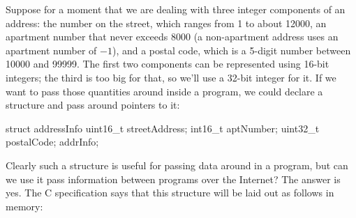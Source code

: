 Suppose for a moment that we are dealing with
three integer components of an address: the number on the street,
which ranges from 1 to about 12000, an apartment number that never exceeds
8000 (a non-apartment address uses an apartment number of $-1$),
and a postal code, which is a 5-digit number between 10000 and
99999.  The first two components can be represented using
16-bit integers; the third is too big for that, so we'll use a 32-bit
integer for it.
%
If we want to pass those quantities around inside a program, we could
declare a structure and pass around pointers to it:
%
\begin{inlinecode}
  struct addressInfo {
     uint16_t  streetAddress;
     int16_t  aptNumber;
     uint32_t   postalCode;
  } addrInfo;
\end{inlinecode}
%
Clearly such a structure is useful for passing data around in a
program, but can we use it pass information between programs over the
Internet?  The answer is yes.  The C specification says that this structure
will be laid out as follows in memory:


